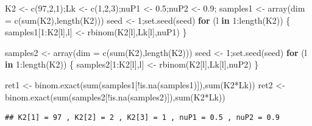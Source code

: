 \documentclass[
]{book}
\newenvironment{Shaded}{\begin{snugshade}}{\end{snugshade}}
\newcommand{\AttributeTok}[1]{\textcolor[rgb]{0.77,0.63,0.00}{#1}}
\newcommand{\ControlFlowTok}[1]{\textcolor[rgb]{0.13,0.29,0.53}{\textbf{#1}}}
\newcommand{\DecValTok}[1]{\textcolor[rgb]{0.00,0.00,0.81}{#1}}
\newcommand{\FloatTok}[1]{\textcolor[rgb]{0.00,0.00,0.81}{#1}}
\newcommand{\FunctionTok}[1]{\textcolor[rgb]{0.00,0.00,0.00}{#1}}
\newcommand{\NormalTok}[1]{#1}
\newcommand{\OtherTok}[1]{\textcolor[rgb]{0.56,0.35,0.01}{#1}}
\newcommand{\SpecialCharTok}[1]{\textcolor[rgb]{0.00,0.00,0.00}{#1}}
\begin{document}
\begin{Shaded}
\begin{Highlighting}[]
\NormalTok{K2 }\OtherTok{\textless{}{-}} \FunctionTok{c}\NormalTok{(}\DecValTok{97}\NormalTok{,}\DecValTok{2}\NormalTok{,}\DecValTok{1}\NormalTok{);Lk }\OtherTok{\textless{}{-}} \FunctionTok{c}\NormalTok{(}\DecValTok{1}\NormalTok{,}\DecValTok{2}\NormalTok{,}\DecValTok{3}\NormalTok{);nuP1 }\OtherTok{\textless{}{-}} \FloatTok{0.5}\NormalTok{;nuP2 }\OtherTok{\textless{}{-}} \FloatTok{0.9}\NormalTok{;}
\NormalTok{samples1 }\OtherTok{\textless{}{-}} \FunctionTok{array}\NormalTok{(}\AttributeTok{dim =} \FunctionTok{c}\NormalTok{(}\FunctionTok{sum}\NormalTok{(K2),}\FunctionTok{length}\NormalTok{(K2)))}
\NormalTok{seed }\OtherTok{\textless{}{-}} \DecValTok{1}\NormalTok{;}\FunctionTok{set.seed}\NormalTok{(seed)}
\ControlFlowTok{for}\NormalTok{ (l }\ControlFlowTok{in} \DecValTok{1}\SpecialCharTok{:}\FunctionTok{length}\NormalTok{(K2)) \{}
\NormalTok{  samples1[}\DecValTok{1}\SpecialCharTok{:}\NormalTok{K2[l],l] }\OtherTok{\textless{}{-}} \FunctionTok{rbinom}\NormalTok{(K2[l],Lk[l],nuP1)}
\NormalTok{\}}

\NormalTok{samples2 }\OtherTok{\textless{}{-}} \FunctionTok{array}\NormalTok{(}\AttributeTok{dim =} \FunctionTok{c}\NormalTok{(}\FunctionTok{sum}\NormalTok{(K2),}\FunctionTok{length}\NormalTok{(K2)))}
\NormalTok{seed }\OtherTok{\textless{}{-}} \DecValTok{1}\NormalTok{;}\FunctionTok{set.seed}\NormalTok{(seed)}
\ControlFlowTok{for}\NormalTok{ (l }\ControlFlowTok{in} \DecValTok{1}\SpecialCharTok{:}\FunctionTok{length}\NormalTok{(K2)) \{}
\NormalTok{  samples2[}\DecValTok{1}\SpecialCharTok{:}\NormalTok{K2[l],l] }\OtherTok{\textless{}{-}} \FunctionTok{rbinom}\NormalTok{(K2[l],Lk[l],nuP2)}
\NormalTok{\}}

\NormalTok{ret1 }\OtherTok{\textless{}{-}} \FunctionTok{binom.exact}\NormalTok{(}\FunctionTok{sum}\NormalTok{(samples1[}\SpecialCharTok{!}\FunctionTok{is.na}\NormalTok{(samples1)]),}\FunctionTok{sum}\NormalTok{(K2}\SpecialCharTok{*}\NormalTok{Lk))}
\NormalTok{ret2 }\OtherTok{\textless{}{-}} \FunctionTok{binom.exact}\NormalTok{(}\FunctionTok{sum}\NormalTok{(samples2[}\SpecialCharTok{!}\FunctionTok{is.na}\NormalTok{(samples2)]),}\FunctionTok{sum}\NormalTok{(K2}\SpecialCharTok{*}\NormalTok{Lk))}
\end{Highlighting}
\end{Shaded}

\begin{verbatim}
## K2[1] = 97 , K2[2] = 2 , K2[3] = 1 , nuP1 = 0.5 , nuP2 = 0.9
\end{verbatim}
\end{document}
